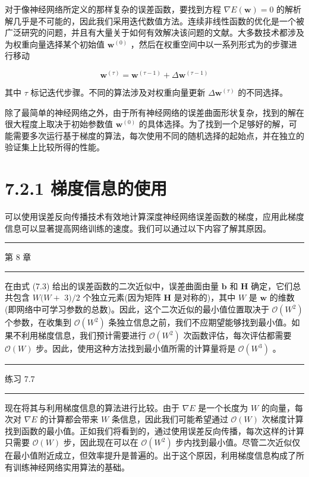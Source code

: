\documentclass[10pt]{report}
\newcommand{\HRule}{\begin{center}\rule{0.9\linewidth}{0.2mm}\end{center}}
\begin{document}
对于像神经网络所定义的那样复杂的误差函数，要找到方程 \(\nabla E\left( \mathbf{w}\right)  = 0\) 的解析解几乎是不可能的，因此我们采用迭代数值方法。连续非线性函数的优化是一个被广泛研究的问题，并且有大量关于如何有效解决该问题的文献。大多数技术都涉及为权重向量选择某个初始值 \({\mathbf{w}}^{\left( 0\right) }\) ，然后在权重空间中以一系列形式为的步骤进行移动

\[
{\mathbf{w}}^{\left( \tau \right) } = {\mathbf{w}}^{\left( \tau  - 1\right) } + \Delta {\mathbf{w}}^{\left( \tau  - 1\right) } \tag{7.15}
\]

其中 \(\tau\) 标记迭代步骤。不同的算法涉及对权重向量更新 \(\Delta {\mathbf{w}}^{\left( \tau \right) }\) 的不同选择。

除了最简单的神经网络之外，由于所有神经网络的误差曲面形状复杂，找到的解在很大程度上取决于初始参数值 \({\mathbf{w}}^{\left( 0\right) }\) 的具体选择。为了找到一个足够好的解，可能需要多次运行基于梯度的算法，每次使用不同的随机选择的起始点，并在独立的验证集上比较所得的性能。

\section*{7.2.1 梯度信息的使用}

可以使用误差反向传播技术有效地计算深度神经网络误差函数的梯度，应用此梯度信息可以显著提高网络训练的速度。我们可以通过以下内容了解其原因。

\HRule

第 8 章

\HRule

在由式 (7.3) 给出的误差函数的二次近似中，误差曲面由量 \(\mathbf{b}\) 和 \(\mathbf{H}\) 确定，它们总共包含 \(W(W +\)  \(3)/2\) 个独立元素(因为矩阵 \(\mathbf{H}\) 是对称的)，其中 \(W\) 是 \(\mathbf{w}\) 的维数(即网络中可学习参数的总数)。因此，这个二次近似的最小值位置取决于 \(\mathcal{O}\left( {W}^{2}\right)\) 个参数，在收集到 \(\mathcal{O}\left( {W}^{2}\right)\) 条独立信息之前，我们不应期望能够找到最小值。如果不利用梯度信息，我们预计需要进行 \(\mathcal{O}\left( {W}^{2}\right)\) 次函数评估，每次评估都需要 \(\mathcal{O}\left( W\right)\) 步。因此，使用这种方法找到最小值所需的计算量将是 \(\mathcal{O}\left( {W}^{3}\right)\) 。

\HRule

练习 7.7

\HRule

现在将其与利用梯度信息的算法进行比较。由于 \(\nabla E\) 是一个长度为 \(W\) 的向量，每次对 \(\nabla E\) 的计算都会带来 \(W\) 条信息，因此我们可能希望通过 \(\mathcal{O}\left( W\right)\) 次梯度计算找到函数的最小值。正如我们将看到的，通过使用误差反向传播，每次这样的计算只需要 \(\mathcal{O}\left( W\right)\) 步，因此现在可以在 \(\mathcal{O}\left( {W}^{2}\right)\) 步内找到最小值。尽管二次近似仅在最小值附近成立，但效率提升是普遍的。出于这个原因，利用梯度信息构成了所有训练神经网络实用算法的基础。
\end{document}
